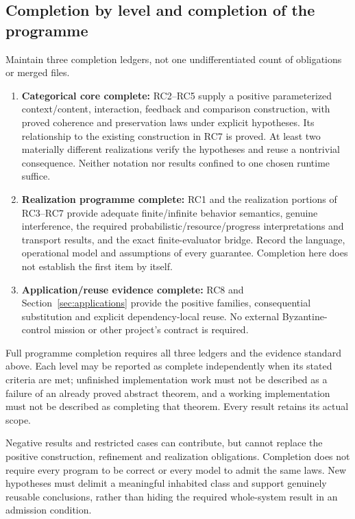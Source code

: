 \documentclass[11pt,a4paper]{article}
\begin{document}
\subsection{Completion by level and completion of the programme}
Maintain three completion ledgers, not one undifferentiated count of obligations or merged files.
\begin{enumerate}[label=\arabic*.]
\item \textbf{Categorical core complete:} RC2--RC5 supply a positive parameterized context/content, interaction, feedback and comparison construction, with proved coherence and preservation laws under explicit hypotheses. Its relationship to the existing construction in RC7 is proved. At least two materially different realizations verify the hypotheses and reuse a nontrivial consequence. Neither notation nor results confined to one chosen runtime suffice.
\item \textbf{Realization programme complete:} RC1 and the realization portions of RC3--RC7 provide adequate finite/infinite behavior semantics, genuine interference, the required probabilistic/resource/progress interpretations and transport results, and the exact finite-evaluator bridge. Record the language, operational model and assumptions of every guarantee. Completion here does not establish the first item by itself.
\item \textbf{Application/reuse evidence complete:} RC8 and Section~\ref{sec:applications} provide the positive families, consequential substitution and explicit dependency-local reuse. No external Byzantine-control mission or other project's contract is required.
\end{enumerate}
Full programme completion requires all three ledgers and the evidence standard above. Each level may be reported as complete independently when its stated criteria are met; unfinished implementation work must not be described as a failure of an already proved abstract theorem, and a working implementation must not be described as completing that theorem. Every result retains its actual scope.

Negative results and restricted cases can contribute, but cannot replace the positive construction, refinement and realization obligations. Completion does not require every program to be correct or every model to admit the same laws. New hypotheses must delimit a meaningful inhabited class and support genuinely reusable conclusions, rather than hiding the required whole-system result in an admission condition.
\end{document}
